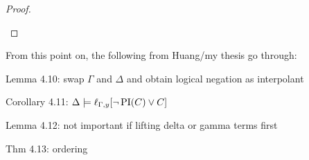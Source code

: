 \documentclass[,%
	paper=a4,%
	DIV14, 
	liststotoc,
	bibtotoc,
	draft=false,%
	numbers=noendperiod
]{scrartcl}
\newcommand{\lif}[1]{\lift{\Delta}{#1}{x}}
\begin{document}
\begin{proof}
\begin{description}
\begin{comment}
			By induction hypothesis (and lemma 11 (huang) and adding the substitution $\sigma'$), 
			$\Gamma \entails \lif{\PI(C_2)}\sigma' \lor \lif{(E[r])}\sigma'$.

			However by assumption $\Gamma \not \entails \lif{E[t]}\sigma'$.

			Hence $\Gamma \not \entails \lif{E[s]}\sigma'$, and
			$\Gamma \not \entails \lif{E[r]}\sigma'$. Therefore $\Gamma \entails \lif{\PI(C_2)}\sigma'$.


			Suppose on the other hand $M \entails \lif{s}\sigma' \neq \lif{t}\sigma'$.

			By the induction hypothesis, 
			$M \entails \lif{\PI(C_1)}\sigma' \lor (\lif{D}\sigma'\lor (\lif{s}=\lif{t})\sigma')$,
			hence then $M \entails \lif{\PI(C_1)}\sigma'$.

			Consequently, 
			$M \entails (\lif{s}\sigma' \neq \lif{t}\sigma' \land \lif{\PI(C_1)}\sigma') \lor (\lif{s}\sigma' = \lif{t}\sigma' \land \lif{\PI(C_2)}\sigma')$.

			By lemma 11 (huang), 
			$M \entails \lif{s \neq {t} \land {\PI(C_1)} \lor ({s} = {t} \land \PI(C_2))}\sigma'$.

			Hence 
			$\Gamma \entails \lif{(s \neq {t} \land {\PI(C_1)} \lor ({s} = {t} \land \PI(C_2))}\sigma' \lor (\lif{D} \lor \lif{E[t]})\sigma') $.

			is this really what i need to show?
		\end{comment}
\end{description}
\end{proof}




From this point on, the following from Huang/my thesis go through:\nopagebreak

Lemma 4.10: swap $\Gamma$ and $\Delta$ and obtain logical negation as interpolant 

Corollary 4.11: $\Delta \models \ell_{\Gamma,y}[ \lnot \operatorname{PI}(C) \lor C]$ 

Lemma 4.12: not important if lifting delta or gamma terms first 

Thm 4.13: ordering 
\end{document}
